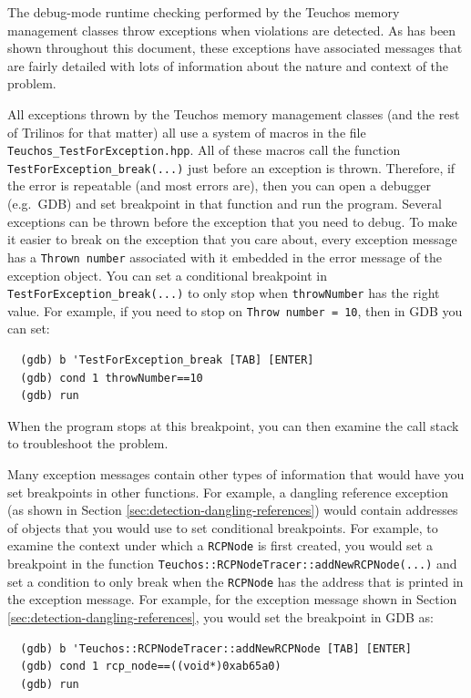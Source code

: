 \documentclass[pdf,ps2pdf,11pt]{SANDreport}
\begin{document}
The debug-mode runtime checking performed by the Teuchos memory
management classes throw exceptions when violations are detected.  As
has been shown throughout this document, these exceptions have
associated messages that are fairly detailed with lots of information
about the nature and context of the problem.

All exceptions thrown by the Teuchos memory management classes (and
the rest of Trilinos for that matter) all use a system of macros in
the file {}\texttt{Teuchos\_TestForException.hpp}.  All of these
macros call the function {}\texttt{TestForException\_break(...)} just
before an exception is thrown.  Therefore, if the error is repeatable
(and most errors are), then you can open a debugger (e.g.\ GDB) and
set breakpoint in that function and run the program.  Several
exceptions can be thrown before the exception that you need to debug.
To make it easier to break on the exception that you care about, every
exception message has a {}\texttt{Thrown number} associated with it
embedded in the error message of the exception object.  You can set a
conditional breakpoint in {}\texttt{TestForException\_break(...)} to
only stop when {}\texttt{throwNumber} has the right value.  For
example, if you need to stop on {}\texttt{Throw number = 10}, then in
GDB you can set:

{\small\begin{verbatim}
  (gdb) b 'TestForException_break [TAB] [ENTER]
  (gdb) cond 1 throwNumber==10
  (gdb) run
\end{verbatim}}

When the program stops at this breakpoint, you can then examine the
call stack to troubleshoot the problem.

Many exception messages contain other types of information that would
have you set breakpoints in other functions.  For example, a dangling
reference exception (as shown in Section
{}\ref{sec:detection-dangling-references}) would contain addresses of
objects that you would use to set conditional breakpoints.  For
example, to examine the context under which a {}\texttt{RCPNode} is
first created, you would set a breakpoint in the function
{}\texttt{Teuchos::RCPNodeTracer::addNewRCPNode(...)} and set a
condition to only break when the {}\texttt{RCPNode} has the address
that is printed in the exception message.  For example, for the
exception message shown in Section
{}\ref{sec:detection-dangling-references}, you would set the
breakpoint in GDB as:

{\small\begin{verbatim}
  (gdb) b 'Teuchos::RCPNodeTracer::addNewRCPNode [TAB] [ENTER]
  (gdb) cond 1 rcp_node==((void*)0xab65a0)
  (gdb) run
\end{verbatim}}
\end{document}
